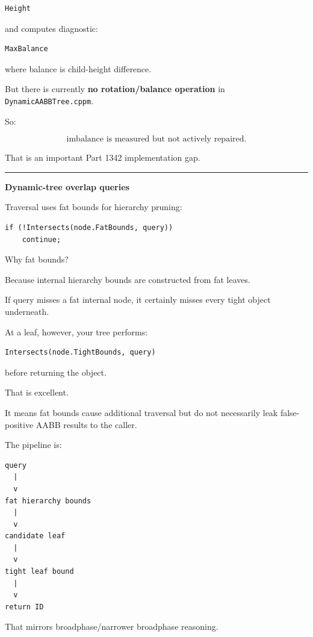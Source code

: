 \begin{verbatim}
Height
\end{verbatim}

and computes diagnostic:

\begin{verbatim}
MaxBalance
\end{verbatim}

where balance is child-height difference.

But there is currently \textbf{no rotation/balance operation} in \texttt{DynamicAABBTree.cppm}.

So:

\[
\boxed{
\text{imbalance is measured but not actively repaired}.
}
\]

That is an important Part 1342 implementation gap.

\begin{center}\rule{0.5\linewidth}{0.5pt}\end{center}

\textbf{Dynamic-tree overlap queries}

Traversal uses fat bounds for hierarchy pruning:

\begin{verbatim}
if (!Intersects(node.FatBounds, query))
    continue;
\end{verbatim}

Why fat bounds?

Because internal hierarchy bounds are constructed from fat leaves.

If query misses a fat internal node, it certainly misses every tight object underneath.

At a leaf, however, your tree performs:

\begin{verbatim}
Intersects(node.TightBounds, query)
\end{verbatim}

before returning the object.

That is excellent.

It means fat bounds cause additional traversal but do not necessarily leak false-positive AABB results to the caller.

The pipeline is:

\begin{verbatim}
query
  |
  v
fat hierarchy bounds
  |
  v
candidate leaf
  |
  v
tight leaf bound
  |
  v
return ID
\end{verbatim}

That mirrors broadphase/narrower broadphase reasoning.

